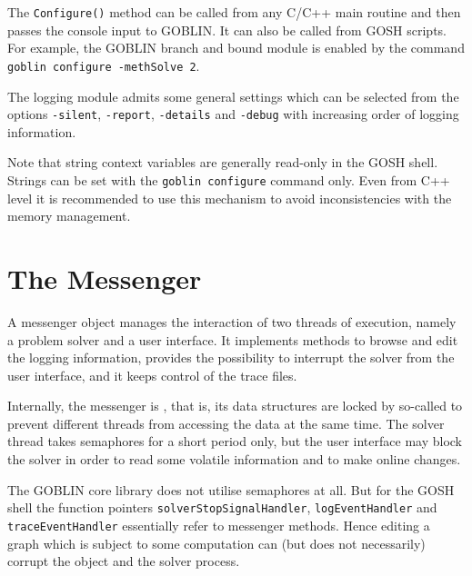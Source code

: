\documentclass[a4paper,11pt,twoside]{book}
\begin{document}
\begin{multicols}{2}
The \verb/Configure()/ method can be called from any C/C++ main routine and then
passes the console input to GOBLIN. It can also be called from GOSH scripts.
For example, the GOBLIN branch and bound module is enabled by the command
\verb/goblin configure -methSolve 2/.

The logging module admits some general settings which can be selected from the options
\verb/-silent/, \verb/-report/, \verb/-details/ and \verb/-debug/ with increasing
order of logging information.

Note that string context variables are generally read-only in the GOSH shell.
Strings can be set with the \verb/goblin configure/ command only. Even from
C++ level it is recommended to use this mechanism to avoid inconsistencies
with the memory management.



\cleardoublepage
{}
\chapter{The Messenger}
\thispagestyle{fancy}
\label{clb_msg}

A messenger object manages the interaction of two threads of execution, namely
a problem solver and a user interface. It implements methods to browse and edit
the logging information, provides the possibility to interrupt the solver from
the user interface, and it keeps control of the trace files.

Internally, the messenger is , that is, its data structures
are locked by so-called  to prevent different threads from
accessing the data at the same time. The solver thread takes semaphores for a
short period only, but the user interface may block the solver in order to read
some volatile information and to make online changes.

The GOBLIN core library does not utilise semaphores at all. But for the GOSH
shell the function pointers \verb/solverStopSignalHandler/,
\verb/logEventHandler/ and \verb/traceEventHandler/ essentially refer to
messenger methods. Hence editing a graph which is subject to some computation
can (but does not necessarily) corrupt the object and the solver process.


\newpage
{}

\end{multicols}
\end{document}
